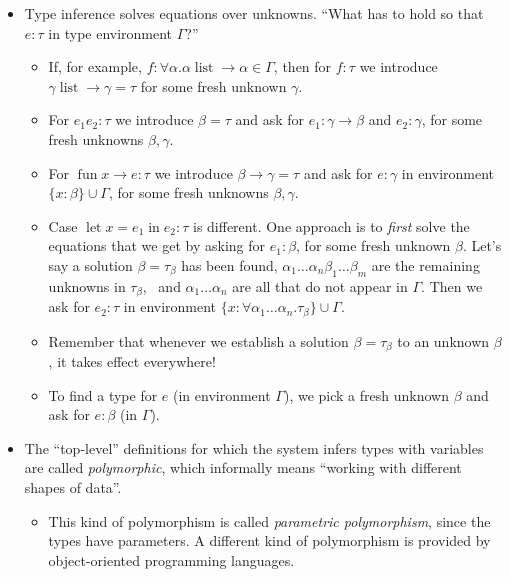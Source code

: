 \documentclass{beamer}
\newcommand{\tmem}[1]{{\em #1\/}}
\newcommand{\tmop}[1]{\ensuremath{\operatorname{#1}}}
\begin{document}
\begin{itemize}
  \item Type inference solves equations over unknowns. ``What has to hold so
  that $e : \tau$ in type environment $\Gamma$?''
  \begin{itemize}
    \item If, for example, $f : \forall \alpha . \alpha \tmop{list}
    \rightarrow \alpha \in \Gamma$, then for $f : \tau$ we introduce $\gamma
    \tmop{list} \rightarrow \gamma = \tau$ for some fresh unknown $\gamma$.
    
    \item For $e_1 e_2 : \tau$ we introduce $\beta = \tau$ and ask for $e_1 :
    \gamma \rightarrow \beta$ and $e_2 : \gamma$, for some fresh unknowns
    $\beta, \gamma$.
    
    \item For $\tmop{fun} x \rightarrow e : \tau$ we introduce $\beta
    \rightarrow \gamma = \tau$ and ask for $e : \gamma$ in environment $\{ x :
    \beta \} \cup \Gamma$, for some fresh unknowns $\beta, \gamma$.
    
    \item Case $\tmop{let} x = e_1 \tmop{in} e_2 : \tau$ is different. One
    approach is to {\tmem{first}} solve the equations that we get by asking
    for $e_1 : \beta$, for some fresh unknown $\beta$. Let's say a solution
    $\beta = \tau_{\beta}$ has been found, $\alpha_1 \ldots \alpha_n \beta_1
    \ldots \beta_m$ are the remaining unknowns in $\tau_{\beta}$, \ and
    $\alpha_1 \ldots \alpha_n$ are all that do not appear in $\Gamma$. Then we
    ask for $e_2 : \tau$ in environment $\{ x : \forall \alpha_1 \ldots
    \alpha_n . \tau_{\beta} \} \cup \Gamma$.
    
    \item Remember that whenever we establish a solution $\beta =
    \tau_{\beta}$ to an unknown $\beta$, it takes effect everywhere!
    
    \item To find a type for $e$ (in environment $\Gamma$), we pick a fresh
    unknown $\beta$ and ask for $e : \beta$ (in $\Gamma$).
  \end{itemize}
  \item The ``top-level'' definitions for which the system infers types with
  variables are called {\tmem{polymorphic}}, which informally means ``working
  with different shapes of data''.
  \begin{itemize}
    \item This kind of polymorphism is called {\tmem{parametric
    polymorphism}}, since the types have parameters. A different kind of
    polymorphism is provided by object-oriented programming languages.
  \end{itemize}
\end{itemize}
\end{document}

